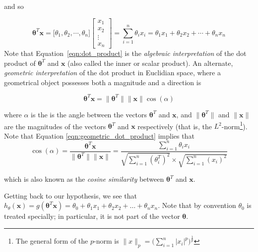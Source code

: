 \documentclass[11pt, oneside]{article}   	%
\begin{document}
\bigskip
\noindent
and so 
  
\begin{equation}
\label{eqn:dot_product}
\boldsymbol{\theta}^T\boldsymbol{x} = 
\Big [\theta_{1}, \theta_{2}, \cdots, \theta_{n}  \Big ]
\left[ \begin{array}{cccc} x_1 \\ x_2 \\ \vdots \\ x_n \end{array} \right] =
\sum\limits_{i = 1}^{n}\theta_{i}x_{i} = \theta_{1}x_1 + \theta_{2}x_2 +  \cdots + \theta_{n}x_n
\end{equation}
Note that Equation~\ref{eqn:dot_product} is the \emph{algebraic interpretation} of the dot product of $\boldsymbol{\theta}^T$ and $\boldsymbol{x}$ (also called the inner or scalar product). An alternate, \emph{geometric interpretation} of the dot product in Euclidian space, where a geometrical object possesses both a magnitude and a direction is

\begin{equation}
\label{eqn:geometric_dot_product}
\boldsymbol{\theta}^T \boldsymbol{x} = \|\boldsymbol{\theta}^T\| \|\boldsymbol{x}\| \cos(\alpha)
\end{equation}

\bigskip
\noindent
where $\alpha$ is the is the angle between the vectors $\boldsymbol{\theta}^T$ and  $\boldsymbol{x}$, and  $\|\boldsymbol{\theta}^T\|$ and $\|\boldsymbol{x}\|$ are the magnitudes of the vectors
$\boldsymbol{\theta}^T$ and  $\boldsymbol{x}$ respectively (that is, the $L^2$-norm\footnote{The general form of the  $p$-norm is $ \| x  \|_{p} = \bigg(\sum\limits_{i=1}^{n} |x_{i}|^{p} \bigg)^{\frac{1}{p}}$}).
Note that Equation \ref{eqn:geometric_dot_product} implies that 
\begin{equation}
\cos(\alpha) = \frac{\boldsymbol{\theta}^T \boldsymbol{x}}{ \|\boldsymbol{\theta}^T\| \|\boldsymbol{x}\|}
= \frac{\sum\limits_{i=1}^{n}\theta_{i} x_{i}}{\sqrt{\sum\limits_{i=1}^{n}(\theta_i^T)^2}\times \sqrt{\sum\limits_{i=1}^{n}(x_{i})^2}}
\end{equation}

\bigskip
\noindent
which is also known as the \emph{cosine similarity} between $\boldsymbol{\theta}^T$ and $\boldsymbol{x}$\cite{COSINE_SIMILARITY}.

\bigskip
\noindent
Getting back to our hypothesis, we see that  $h_{\theta}(\boldsymbol{x}) = g(\boldsymbol{\theta}^{T}\boldsymbol{x}) = \theta_0 + \theta_{1}x_1 + \theta_{2}x_2 +  \ldots + \theta_{n}x_n$. Note that by convention $\theta_{0}$ is treated specially; in particular, it is not part of the vector $\boldsymbol{\theta}$.
\end{document}
